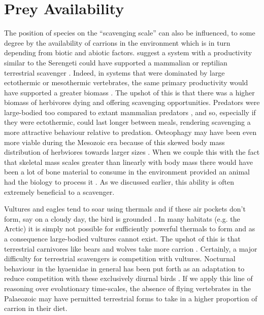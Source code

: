 \documentclass[a4paper,12pt]{article}
\begin{document}

\section*{Prey Availability}
The position of species on the ``scavenging scale'' can also be influenced, to some degree by the availability of carrions in the environment which is in turn depending from biotic and abiotic factors. %
\cite{ruxton2004obligate} suggest a system with a productivity similar to the Serengeti could have supported a mammalian or reptilian terrestrial scavenger \citep{ruxton2004obligate}.
Indeed, in systems that were dominated by large ectothermic or mesothermic vertebrates, the same primary productivity would have supported a greater biomass \citep{mcnab2009resources}.
The upshot of this is that there was a higher biomass of herbivores dying and offering scavenging opportunities.
Predators were large-bodied too compared to extant mammalian predators \citep{mcnab2009resources}, and so, especially if they were ectothermic, could last longer between meals, rendering scavenging a more attractive behaviour relative to predation.
Osteophagy may have been even more viable during the Mesozoic era because of this skewed body mass distribution of herbviores towards larger sizes \citep{10.1371/journal.pone.0051925}.
When we couple this with the fact that skeletal mass scales greater than linearly with body mass \citep{prange1979scaling} there would have been a lot of bone material to consume in the environment provided an animal had the biology to process it \citep{chure1997one}.
As we discussed earlier, this ability is often extremely beneficial to a scavenger.

Vultures and eagles tend to soar using thermals and if these air pockets don't form, say on a cloudy day, the bird is grounded \citep{mundy1992vultures}.
In many habitats (e.g. the Arctic) it is simply not possible for sufficiently powerful thermals to form and as a consequence large-bodied vultures cannot exist.
The upshot of this is that terrestrial carnivores like bears and wolves take more carrion \citep{devault2003scavenging}.
Certainly, a major difficulty for terrestrial scavengers is competition with vultures.
Nocturnal behaviour in the hyaenidae in general has been put forth as an adaptation to reduce competition with these exclusively diurnal birds \citep{gittleman2013carnivore}.
If we apply this line of reasoning over evolutionary time-scales, the absence of flying vertebrates in the Palaeozoic may have permitted terrestrial forms to take in a higher proportion of carrion in their diet.
\end{document}
